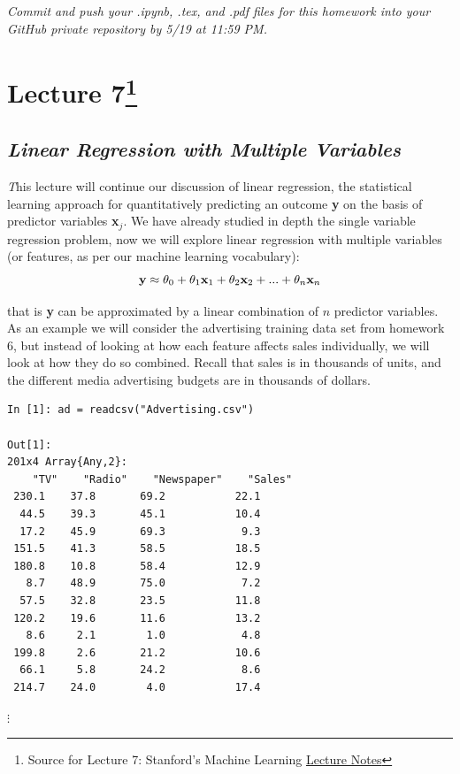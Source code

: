 \documentclass[11pt,a4paper,oneside]{report}
\begin{document}
{\it Commit and push your .ipynb, .tex, and .pdf files for this homework into your GitHub private repository by 5/19 at 11:59 PM.}

\newpage
\section*{Lecture 7\footnote{Source for Lecture 7: Stanford's Machine Learning \href{http://cs229.stanford.edu/notes/cs229-notes1.pdf}{Lecture Notes}}}

{\center\color{magenta}
\subsection*{\it\huge Linear Regression with Multiple Variables}}

{\it\huge T}his lecture will continue our discussion of linear regression, the statistical learning approach for quantitatively predicting an outcome {\bf y} on the basis of predictor variables {\bf x}$_j$. We have already studied in depth the single variable regression problem, now we will explore linear regression with multiple variables (or features, as per our machine learning vocabulary):
\[
\textnormal{{\bf y}} \approx  \theta_0 +
\theta_1 \textnormal{{\bf x}}_1 +
\theta_2 \textnormal{{\bf x}}_2 + ... +
\theta_n \textnormal{{\bf x}}_n
\]

that is {\bf y} can be approximated by a linear combination of $n$ predictor variables.\\

As an example we will consider the advertising training data set from homework 6, but instead of looking at how each feature affects sales individually, we will look at how they do so combined. Recall that sales is in thousands of units, and the different media advertising budgets are in thousands of dollars.\\

\begin{verbatim}
In [1]: ad = readcsv("Advertising.csv")

Out[1]:
201x4 Array{Any,2}:
    "TV"    "Radio"    "Newspaper"    "Sales"
 230.1    37.8       69.2           22.1     
  44.5    39.3       45.1           10.4     
  17.2    45.9       69.3            9.3     
 151.5    41.3       58.5           18.5     
 180.8    10.8       58.4           12.9     
   8.7    48.9       75.0            7.2     
  57.5    32.8       23.5           11.8     
 120.2    19.6       11.6           13.2     
   8.6     2.1        1.0            4.8     
 199.8     2.6       21.2           10.6     
  66.1     5.8       24.2            8.6     
 214.7    24.0        4.0           17.4     
\end{verbatim}  
$\vdots$\\
                                                            
\end{document}

